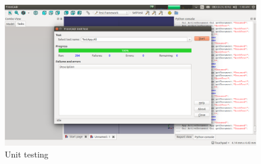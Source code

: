 \begin{enumerate}
     \begin{figure}
         \centering
         \includegraphics[width=\linewidth]{images/regression.png}
         \caption{Unit testing}
         \label{regression}
     \end{figure}
   
 \end{enumerate}


		
		

